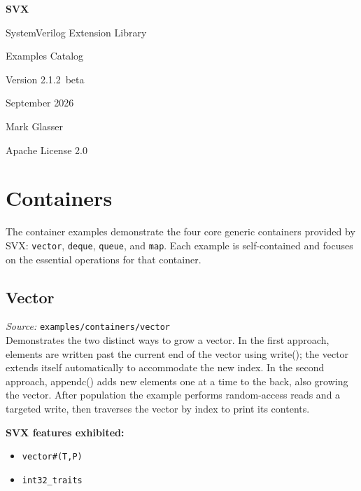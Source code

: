 \documentclass[11pt,letterpaper]{report}
\begin{document}
\begin{titlepage}
  \centering
  \vspace*{2cm}
  {\Huge\bfseries SVX\par}
  \vspace{0.5em}
  {\Large SystemVerilog Extension Library\par}
  \vspace{1.5em}
  {\huge Examples Catalog\par}
  \vspace{1em}
  {\large Version 2.1.2~beta\par}
  \vspace{0.5em}
  {\large September 2026\par}
  \vspace{0.5em}
  {\large Mark Glasser\par}
  \vspace{0.5em}
  {\large Apache License 2.0\par}
\end{titlepage}

\tableofcontents
\newpage
\chapter{Containers}

The container examples demonstrate the four core generic containers provided by SVX\@: \texttt{vector}, \texttt{deque}, \texttt{queue}, and \texttt{map}.  Each example is self-contained and focuses on the essential operations for that container.

\section{Vector}

\textit{Source:} \texttt{examples/containers/vector}\\

Demonstrates the two distinct ways to grow a vector. In the first approach, elements are written past the current end of the vector using write(); the vector extends itself automatically to accommodate the new index. In the second approach, appendc() adds new elements one at a time to the back, also growing the vector. After population the example performs random-access reads and a targeted write, then traverses the vector by index to print its contents.

\textbf{SVX features exhibited:}

\begin{itemize}
  \item \texttt{vector\#(T,P)}
  \item \texttt{int32\_traits}
\end{itemize}
\end{document}
